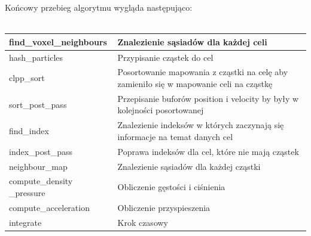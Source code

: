 \documentclass[polish, 12pt]{aghthesis}
\begin{document}
			\noindent Końcowy przebieg algorytmu wygląda następująco:
			\ \\
			\ \\
			\begin{tabular}{| p{} | p{} |}
				\hline
					find\_voxel\_neighbours & Znalezienie sąsiadów dla każdej celi \\
				\hline
					hash\_particles & Przypisanie cząstek do cel \\
				\hline
					clpp\_sort & Posortowanie mapowania z cząstki na celę aby zamieniło się w mapowanie celi na cząstkę\\
				\hline
					sort\_post\_pass & Przepisanie buforów position i velocity by były w kolejności posortowanej\\
				\hline
					find\_index & Znalezienie indeksów w których zaczynają się informacje na temat danych cel \\
				\hline
					index\_post\_pass & Poprawa indeksów dla cel, które nie mają cząstek \\
				\hline
					neighbour\_map & Znalezienie sąsiadów dla każdej cząstki \\
				\hline
					compute\_density \_pressure & Obliczenie gęstości i ciśnienia \\
				\hline
					compute\_acceleration & Obliczenie przyspieszenia \\
				\hline
					integrate & Krok czasowy \\
				\hline
			\end{tabular}
			
\end{document}

